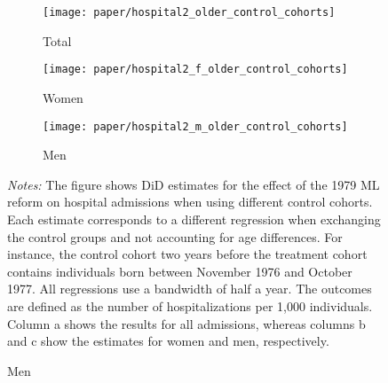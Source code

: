 \begin{landscape}
	\vspace*{\fill}
	\begin{figure}[H]\centering
		\caption{Potential spillover effects on older siblings for hospital admission}\label{fig_mlch: SUTVA_older_controls_hospital2}
		\begin{subfigure}[h]{0.31\linewidth}\centering\caption{Total}
			\texttt{[image: paper/hospital2\_older\_control\_cohorts]}
		\end{subfigure}
		\begin{subfigure}[h]{0.31\linewidth}\centering\caption{Women}
			\texttt{[image: paper/hospital2\_f\_older\_control\_cohorts]}
		\end{subfigure}
		\begin{subfigure}[h]{0.31\linewidth}\centering\caption{Men}
			\texttt{[image: paper/hospital2\_m\_older\_control\_cohorts]}
		\end{subfigure}
		\begin{minipage}{\linewidth}
			\scriptsize \emph{Notes:} The figure shows DiD estimates for the effect of the 1979 ML reform on hospital admissions when using different control cohorts. Each estimate corresponds to a different regression when exchanging the control groups and not accounting for age differences. For instance, the control cohort two years before the treatment cohort contains individuals born between November 1976 and October 1977. All regressions use a bandwidth of half a year. The outcomes are defined as the number of hospitalizations per 1,000 individuals. Column a shows the results for all admissions, whereas columns b and c show the estimates for women and men, respectively.
		\end{minipage}
	\end{figure}
	\vspace*{\fill}\clearpage
\end{landscape}